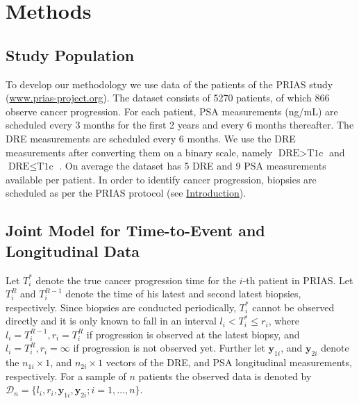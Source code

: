 
\section{Methods}
\label{sec:methods}
\subsection{Study Population}
To develop our methodology we use data of the patients of the PRIAS study (\url{www.prias-project.org}). The dataset consists of 5270 patients, of which 866 observe cancer progression. For each patient, PSA measurements (ng/mL) are scheduled every 3 months for the first 2 years and every 6 months thereafter. The DRE measurements are scheduled every 6 months. We use the DRE measurements after converting them on a binary scale, namely $\mbox{DRE} > \mbox{T1c}$ and $\mbox{DRE} \leq \mbox{T1c}$ \cite{schroder1992tnm}. On average the dataset has 5 DRE and 9 PSA measurements available per patient. In order to identify cancer progression, biopsies are scheduled as per the PRIAS protocol (see \hyperref[sec:introduction]{Introduction}).

\subsection{Joint Model for Time-to-Event and Longitudinal Data}
Let $T_i^*$ denote the true cancer progression time for the $i$-th patient in PRIAS. Let $T_i^R$ and $T_i^{R-1}$ denote the time of his latest and second latest biopsies, respectively. Since biopsies are conducted periodically, $T_i^*$ cannot be observed directly and it is only known to fall in an interval ${l_i < T_i^* \leq r_i}$, where ${l_i = T_i^{R-1}, r_i = T_i^R}$ if progression is observed at the latest biopsy, and ${l_i = T_i^R, r_i=\infty}$ if progression is not observed yet. Further let $\boldsymbol{y}_{1i}$, and $\boldsymbol{y}_{2i}$ denote the $n_{1i} \times 1$, and $n_{2i} \times 1$ vectors of the DRE, and PSA longitudinal measurements, respectively. For a sample of $n$ patients the observed data is denoted by ${\mathcal{D}_n = \{l_i, r_i, \boldsymbol{y}_{1i}, \boldsymbol{y}_{2i}; i = 1, \ldots, n\}}$.

